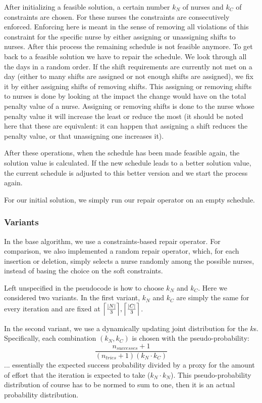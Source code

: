 \documentclass{article}
\begin{document}
After initializing a feasible solution, a certain number $k_N$ of nurses and $k_C$ of constraints are chosen.
For these nurses the constraints are consecutively enforced.
Enforcing here is meant in the sense of removing all violations of this constraint for the specific nurse by either assigning or unassigning shifts to nurses.
After this process the remaining schedule is not feasible anymore.
To get back to a feasible solution we have to repair the schedule. 
We look through all the days in a random order.
If the shift requirements are currently not met on a day (either to many shifts are assigned or not enough shifts are assigned), we fix it by either assigning shifts of removing shifts.
This assigning or removing shifts to nurses is done by looking at the impact the change would have on the total penalty value of a nurse.
Assigning or removing shifts is done to the nurse whose penalty value it will increase the least or reduce the most (it should be noted here that these are equivalent: it can happen that assigning a shift reduces the penalty value, or that unassigning one increases it).

After these operations, when the schedule has been made feasible again, the solution value is calculated.
If the new schedule leads to a better solution value, the current schedule is adjusted to this better version and we start the process again.

For our initial solution, we simply run our repair operator on an empty schedule.

\subsubsection{Variants}

In the base algorithm, we use a constraints-based repair operator.
For comparison, we also implemented a random repair operator, which, for each insertion or deletion, simply selects a nurse randomly among the possible nurses, instead of basing the choice on the soft constraints.

Left unspecified in the pseudocode is how to choose $k_N$ and $k_C$.
Here we considered two variants.
In the first variant, $k_N$ and $k_C$ are simply the same for every iteration and are fixed at $\Bigl \lceil \frac{|N|}{3} \Bigr \rceil, \Bigl \lceil \frac{|C|}{3} \Bigr \rceil$.

In the second variant, we use a dynamically updating joint distribution for the $k$s.
Specifically, each combination $(k_N,k_C)$ is chosen with the pseudo-probability:
$$\frac{n_{successes}+1}{(n_{tries}+1) (k_N \cdot k_C)}$$
... essentially the expected success probability divided by a proxy for the amount of effort that the iteration is expected to take ($k_N \cdot k_N$).
This pseudo-probability distribution of course has to be normed to sum to one, then it is an actual probability distribution.
\end{document}
